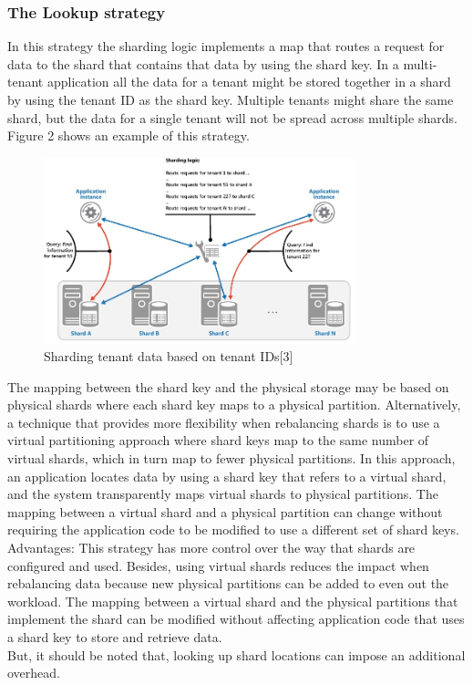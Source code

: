 \documentclass[10pt, conference]{IEEEtran}
\begin{document}
\subsubsection{The Lookup strategy}
\indent  In this strategy the sharding logic implements a map that routes a request for data to the shard that contains that data by using the shard key. In a multi-tenant application all the data for a tenant might be stored together in a shard by using the tenant ID as the shard key. Multiple tenants might share the same shard, but the data for a single tenant will not be spread across multiple shards. Figure 2 shows an example of this strategy. \\
\begin{figure}[h!]
	\centering
	\includegraphics[width=9cm]{figure2.jpg}
	\caption{Sharding tenant data based on tenant IDs[3]}
\end{figure} 
\indent The mapping between the shard key and the physical storage may be based on physical shards where each shard key maps to a physical partition. Alternatively, a technique that provides more flexibility when rebalancing shards is to use a virtual partitioning approach where shard keys map to the same number of virtual shards, which in turn map to fewer physical partitions. In this approach, an application locates data by using a shard key that refers to a virtual shard, and the system transparently maps virtual shards to physical partitions. The mapping between a virtual shard and a physical partition can change without requiring the application code to be modified to use a different set of shard keys.\\
\indent Advantages: This strategy has more control over the way that shards are configured and used. Besides, using virtual shards reduces the impact when rebalancing data because new physical partitions can be added to even out the workload. The mapping between a virtual shard and the physical partitions that implement the shard can be modified without affecting application code that uses a shard key to store and retrieve data.\\
\indent But, it should be noted that, looking up shard locations can impose an additional overhead.
\end{document}
